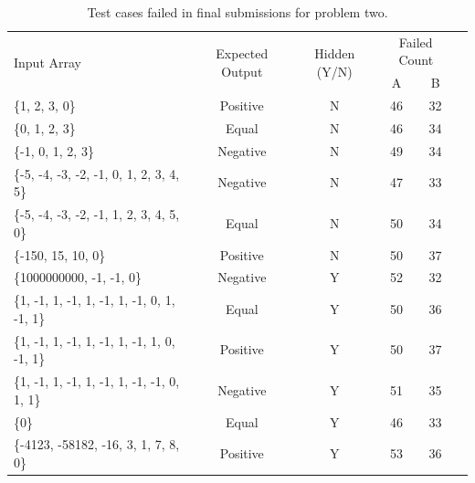 \documentclass[sigconf,authorversion,nonacm]{acmart}
\begin{document}
\begin{table}
  \caption{Test cases failed in final submissions for problem two.}
  \label{tab:freq}
  \begin{tabular}{l|c|c|c|c|c}
    \toprule
    \multirow{2}{*}{Input Array} & \multirow{2}{*}{Expected Output} & \multirow{2}{*}{Hidden (Y/N)} & \multicolumn{2}{c}{Failed Count} \\
    \cmidrule{4-5}
    & & & A & B \\
    \midrule
    \{1, 2, 3, 0\} & Positive & N & 46 & 32 \\
    \midrule
     \{0, 1, 2, 3\} & Equal & N & 46 & 34 \\
    \midrule
    \{-1, 0, 1, 2, 3\} & Negative & N & 49 & 34 \\
    \midrule
    \{-5, -4, -3, -2, -1, 0, 1, 2, 3, 4, 5\} & Negative & N & 47 & 33\\
    \midrule
    \{-5, -4, -3, -2, -1, 1, 2, 3, 4, 5, 0\}& Equal & N & 50 & 34\\
    \midrule
    \{-150, 15, 10, 0\}& Positive & N & 50 & 37\\
    \midrule
    \{1000000000, -1, -1, 0\}& Negative & Y & 52 & 32\\
    \midrule
    \{1, -1, 1, -1, 1, -1, 1, -1, 0, 1, -1, 1\}& Equal & Y & 50 & 36\\
    \midrule
    \{1, -1, 1, -1, 1, -1, 1, -1, 1, 0, -1, 1\}& Positive & Y & 50 & 37 \\
    \midrule
    \{1, -1, 1, -1, 1, -1, 1, -1, -1, 0, 1, 1\}& Negative & Y & 51  & 35\\
    \midrule
    \{0\}& Equal & Y & 46 & 33 \\
    \midrule
    \{-4123, -58182, -16, 3, 1, 7, 8, 0\}& Positive & Y & 53 & 36 \\
  \bottomrule
\end{tabular}
\end{table}
\end{document}
